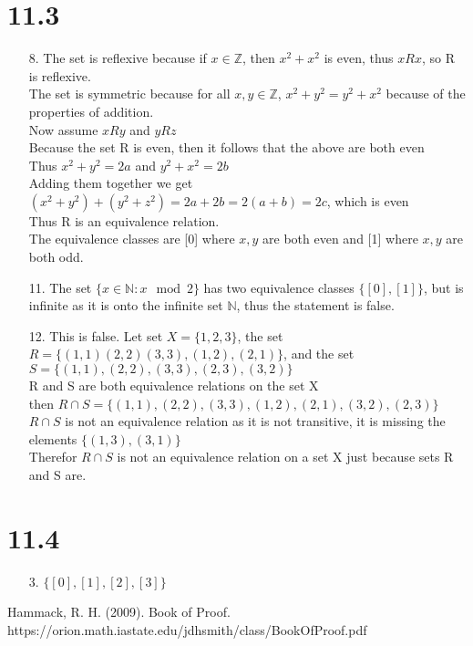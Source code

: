 \documentclass[sigconf]{article}
\begin{document}
\section*{11.3}
\begin{itemize}
  \item[8.] The set is reflexive because if $x\in\mathbb{Z}$, then $x^2+x^2$ is even, thus $xRx$, so R is reflexive.\\
             The set is symmetric because for all $x,y\in\mathbb{Z}$, $x^2+y^2=y^2+x^2$ because of the properties of addition.\\
             Now assume $xRy$ and $yRz$\\
             Because the set R is even, then it follows that the above are both even\\
             Thus $x^2+y^2=2a$ and $y^2+x^2=2b$\\
             Adding them together we get $(x^2+y^2)+(y^2+z^2)=2a+2b=2(a+b)=2c$, which is even\\
             Thus R is an equivalence relation.\\
             The equivalence classes are [0] where $x,y$ are both even and [1] where $x,y$ are both odd.
  \item[11.] The set $\{x\in\mathbb{N}:x\mod 2\}$ has two equivalence classes $\{[0],[1]\}$, but is infinite as it is onto the infinite set $\mathbb{N}$, thus the statement is false.
  \item[12.] This is false. Let set $X=\{1,2,3\}$, the set $R=\{(1,1)(2,2)(3,3),(1,2),(2,1)\}$, and the set $S=\{(1,1),(2,2),(3,3),(2,3),(3,2)\}$\\
              R and S are both equivalence relations on the set X\\
              then $R\cap S=\{(1,1),(2,2),(3,3),(1,2),(2,1),(3,2),(2,3)\}$\\
              $R\cap S$ is not an equivalence relation as it is not transitive, it is missing the elements $\{(1,3),(3,1)\}$\\
              Therefor $R\cap S$ is not an equivalence relation on a set X just because sets R and S are.
\end{itemize}

\section*{11.4}
\begin{itemize}
  \item[3.] $\{[0],[1],[2],[3]\}$
\end{itemize}


Hammack, R. H. (2009). Book of Proof.\\ https://orion.math.iastate.edu/jdhsmith/class/BookOfProof.pdf



\end{document}
